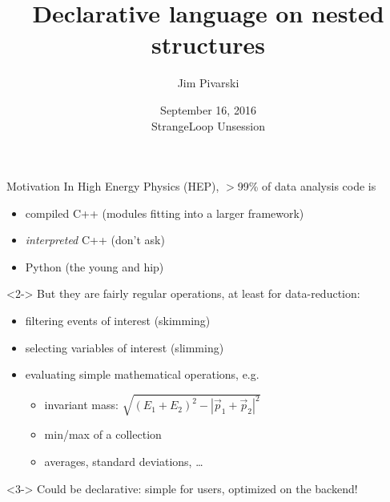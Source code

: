\documentclass{beamer}
\title[16-09-2016-unsession]{Declarative language on nested structures}
\author{Jim Pivarski}
\institute{Princeton University -- Project DIANA}
\date{September 16, 2016 \\ StrangeLoop Unsession}
\begin{document}

\begin{frame}
  \titlepage
\end{frame}



\begin{frame}{Motivation}
\vspace{0.5 cm}
In High Energy Physics (HEP), $>$99\% of data analysis code is
\begin{itemize}
\item compiled C++ (modules fitting into a larger framework)
\item {\it interpreted} C++ (don't ask)
\item Python (the young and hip)
\end{itemize}

\vspace{0.5 cm}
\begin{uncoverenv}<2->
But they are fairly regular operations, at least for data-reduction:
\begin{itemize}
\item filtering events of interest (skimming)
\item selecting variables of interest (slimming)
\item evaluating simple mathematical operations, e.g.
\begin{itemize}
\item invariant mass: $\sqrt{(E_1 + E_2)^2 - |\vec{p}_1 + \vec{p}_2|^2}$
\item min/max of a collection
\item averages, standard deviations, \ldots
\end{itemize}
\end{itemize}
\end{uncoverenv}

\vspace{0.5 cm}
\begin{uncoverenv}<3->
Could be declarative: simple for users, optimized on the backend!
\end{uncoverenv}
\end{frame}
\end{document}
